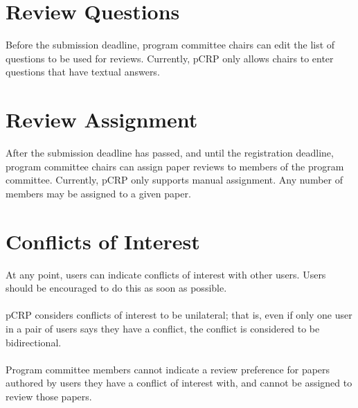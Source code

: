 \documentclass[12pt]{article}
\begin{document}
\section{Review Questions}
	Before the submission deadline, program committee chairs can edit the
	list of questions to be used for reviews. Currently, pCRP only allows
	chairs to enter questions that have textual answers.

\section{Review Assignment}
	After the submission deadline has passed, and until the registration
	deadline, program committee chairs can assign paper reviews to members
	of the program committee. Currently, pCRP only supports manual
	assignment. Any number of members may be assigned to a given paper.

\section{Conflicts of Interest}
	At any point, users can indicate conflicts of interest with other users.
	Users should be encouraged to do this as soon as possible.
	\\\\
	pCRP considers conflicts of interest to be unilateral; that is, even if
	only one user in a pair of users says they have a conflict, the conflict
	is considered to be bidirectional.
	\\\\
	Program committee members cannot indicate a review preference for papers
	authored by users they have a conflict of interest with, and cannot be
	assigned to review those papers.



\end{document}
